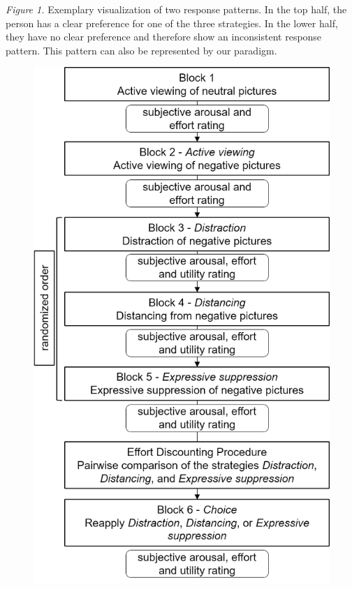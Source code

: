 \documentclass[
  man,floatsintext]{apa6}
\begin{document}
\emph{Figure 1.} Exemplary visualization of two response patterns.
In the top half, the person has a clear preference for one of the three strategies.
In the lower half, they have no clear preference and therefore show an inconsistent response pattern.
This pattern can also be represented by our paradigm.

\begin{figure}[H]
\includegraphics[width=\textwidth]{figures/Design_ER-ED} \caption{ }\label{fig:DesignEREDappendix}
\end{figure}
\end{document}
